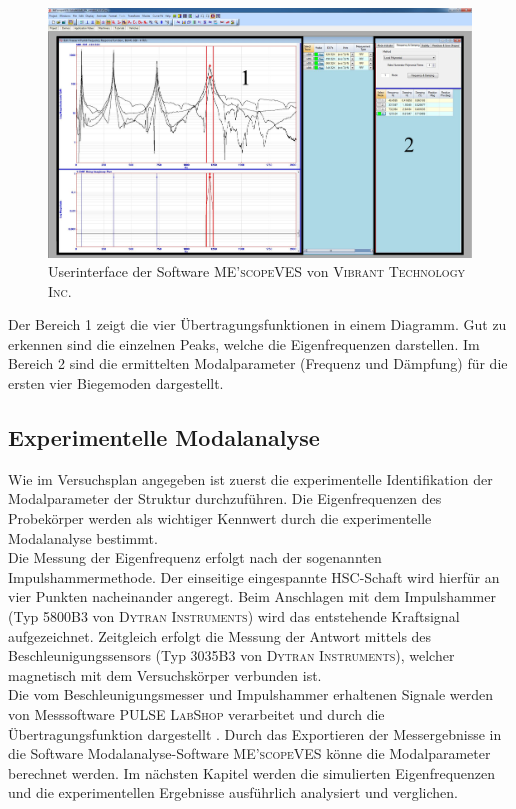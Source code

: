 	\begin{figure}[H]
		\centering
		\includegraphics[width=0.97\linewidth, height=0.42\textheight]{Experimentelle_Untersuchungen/Schaft_10x8_0N_parallel_Ergebnisse.png}
		\caption{Userinterface der Software \textsc{ME'scopeVES} von \textsc{Vibrant Technology Inc.}}
		\label{fig:ME'scopeVES-Software}
	\end{figure}
	
	Der Bereich 1 zeigt die vier Übertragungsfunktionen in einem Diagramm. Gut zu erkennen sind die einzelnen Peaks, welche die Eigenfrequenzen darstellen. Im Bereich 2 sind die ermittelten Modalparameter (Frequenz und Dämpfung) für die ersten vier Biegemoden dargestellt.
	
	
	
	\subsection{Experimentelle Modalanalyse}\label{sec:Experimentelle Modalanalyse}
	Wie im Versuchsplan angegeben ist zuerst die experimentelle Identifikation der Modalparameter der Struktur durchzuführen. Die Eigenfrequenzen des Probekörper werden als wichtiger Kennwert durch die experimentelle Modalanalyse bestimmt.\\	
	
	Die Messung der Eigenfrequenz erfolgt nach der sogenannten Impulshammermethode. Der einseitige eingespannte HSC-Schaft wird hierfür an vier Punkten nacheinander angeregt. Beim Anschlagen mit dem Impulshammer (Typ 5800B3 von \textsc{Dytran Instruments}) wird das entstehende Kraftsignal aufgezeichnet. Zeitgleich erfolgt die Messung der Antwort mittels des Beschleunigungssensors (Typ 3035B3 von \textsc{Dytran Instruments}), welcher magnetisch mit dem Versuchskörper verbunden ist.\\
	
	Die vom Beschleunigungsmesser und Impulshammer erhaltenen Signale werden von Messsoftware \textsc{PULSE LabShop} verarbeitet und durch die Übertragungsfunktion dargestellt \cite{dossing1989strukturen}. Durch das Exportieren der Messergebnisse in die Software Modalanalyse-Software \textsc{ME'scopeVES} könne die Modalparameter berechnet werden. Im nächsten Kapitel werden die simulierten Eigenfrequenzen und die experimentellen Ergebnisse ausführlich analysiert und verglichen.
	
	